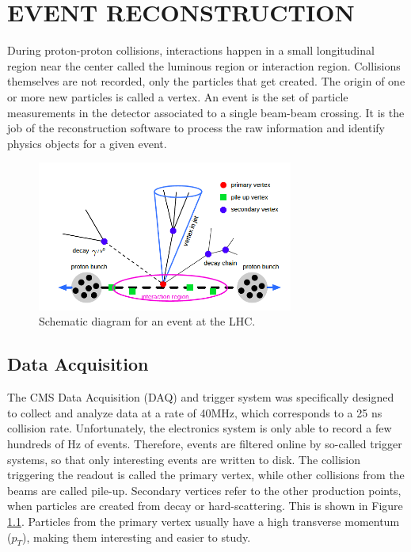 %
%
%
%



\chapter{EVENT RECONSTRUCTION \label{cha:eventreco}}
During proton-proton collisions, interactions happen in a small longitudinal region near the center called the luminous region or interaction region. Collisions themselves are not recorded, only the particles that get created. The origin of one or more new particles is called a vertex. An event is the set of particle measurements in the detector associated to a single beam-beam crossing. It is the job of the reconstruction software to process the raw information and identify physics objects for a given event.

 \begin{figure}[H]
 	\centering
 	\includegraphics[width=0.75\textwidth]{figures/eventvertex.png}
 	\singlespace
 	\caption{Schematic diagram for an event at the LHC.}
 	\label{fig:vertex}
 \end{figure}


\section{Data Acquisition}
The CMS Data Acquisition (DAQ) and trigger system was specifically designed to collect and analyze data at a rate of 40MHz, which corresponds to a 25 ns collision rate. Unfortunately, the electronics system is only able to record a few hundreds of Hz of events. Therefore, events are filtered online by so-called trigger systems, so that only interesting events are written to disk. The collision triggering the readout is called the primary vertex, while other collisions from the beams are called pile-up. Secondary vertices refer to the other production points, when particles are created from decay or hard-scattering. This is shown in Figure \ref{fig:vertex}. Particles from the primary vertex usually have a high transverse momentum ($p_{T}$), making them interesting and easier to study.

